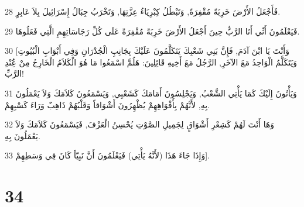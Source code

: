 \par 28 فَأَجْعَلُ الأَرْضَ خَرِبَةً مُقْفِرَةً, وَتَبْطُلُ كِبْرِيَاءُ عِزَّتِهَا, وَتَخْرَبُ جِبَالُ إِسْرَائِيلَ بِلاَ عَابِرٍ.
\par 29 فَيَعْلَمُونَ أَنِّي أَنَا الرَّبُّ حِينَ أَجْعَلُ الأَرْضَ خَرِبَةً مُقْفِرَةً عَلَى كُلِّ رَجَاسَاتِهِمِ الَّتِي فَعَلُوهَا.
\par 30 [وَأَنْتَ يَا ابْنَ آدَمَ, فَإِنَّ بَنِي شَعْبِكَ يَتَكَلَّمُونَ عَلَيْكَ بِجَانِبِ الْجُدْرَانِ وَفِي أَبْوَابِ الْبُيُوتِ وَيَتَكَلَّمُ الْوَاحِدُ مَعَ الآخَرِ, الرَّجُلُ مَعَ أَخِيهِ قَائِلِينَ: هَلُمَّ اسْمَعُوا مَا هُوَ الْكَلاَمُ الْخَارِجُ مِنْ عَُِنْدِ الرَّبِّ!
\par 31 وَيَأْتُونَ إِلَيْكَ كَمَا يَأْتِي الشَّعْبُ, وَيَجْلِسُونَ أَمَامَكَ كَشَعْبِي, وَيَسْمَعُونَ كَلاَمَكَ وَلاَ يَعْمَلُونَ بِهِ, لأَنَّهُمْ بِأَفْوَاهِهِمْ يُظْهِرُونَ أَشْوَاقاً وَقَلْبُهُمْ ذَاهِبٌ وَرَاءَ كَسْبِهِمْ.
\par 32 وَهَا أَنْتَ لَهُمْ كَشِعْرِ أَشْوَاقٍ لِجَمِيلِ الصَّوْتِ يُحْسِنُ الْعَزْفَ, فَيَسْمَعُونَ كَلاَمَكَ وَلاَ يَعْمَلُونَ بِهِ.
\par 33 وَإِذَا جَاءَ هَذَا (لأَنَّهُ يَأْتِي) فَيَعْلَمُونَ أَنَّ نَبِيّاً كَانَ فِي وَسَطِهِمْ].

\chapter{34}

